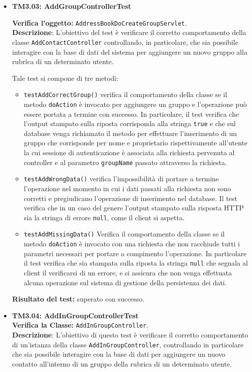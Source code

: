 \begin{itemize}
\item[\passed] \textbf{TM3.03: AddGroupControllerTest}

\textbf{Verifica l'oggetto:} \texttt{AddressBookDoCreateGroupServlet}.\\
\textbf{Descrizione}: L'obiettivo del test è verificare il corretto comportamento della classe \texttt{AddContactController} controllando, in particolare, che sia possibile interagire con la base di dati del sistema per aggiungere un nuovo gruppo alla rubrica di un determinato utente.

Tale test si compone di tre metodi:
\begin{itemize}
\item \texttt{testAddCorrectGroup()} verifica il comportamento della classe se il metodo \texttt{doAction} è invocato per aggiungere un gruppo e l'operazione può essere portata a termine con successo. In particolare, il test verifica che l'output stampato sulla riposta corrisponda alla stringa \texttt{true} e che sul database venga richiamato il metodo per effettuare l'inserimento di un gruppo che corrisponde per nome e proprietario rispettivamente all'utente la cui sessione di autenticazione è associata alla richiesta pervenuta al controller e al parametro \texttt{groupName} passato attraverso la richiesta.

\item \texttt{testAddWrongData()} verifica l'impossibilità di portare a termine l'operazione nel momento in cui i dati passati alla richiesta non sono corretti e pregiudicano l'operazione di inserimento nel database. Il test verifica che in un caso del genere l'output stampato sulla risposta HTTP sia la stringa di errore \texttt{null}, come il client si aspetta.

\item \texttt{testAddMissingData()} Verifica il comportamento della classe se il metodo \texttt{doAction} è invocato con una richiesta che non racchiude tutti i parametri necessari per portare a compimento l'operazione. In particolare il test verifica che sia stampata sulla riposta la stringa \texttt{null} che segnala al client il verificarsi di un errore, e si assicura che non venga effettuata alcuna operazione sul sistema di gestione della persistenza dei dati.
\end{itemize}
\textbf{Risultato del test:} superato con successo.

\item[\passed] \textbf{TM3.04: AddInGroupControllerTest}\\
\textbf{Verifica la Classe:} \texttt{AddInGroupController}.\\
\textbf{Descrizione}: L'obiettivo di questo test è verificare il corretto comportamento di un'istanza della classe \texttt{AddInGroupController}, controllando in particolare che sia possibile interagire con la base di dati per aggiungere un nuovo contatto all'interno di un gruppo della rubrica di un determinato utente.


\end{itemize}
